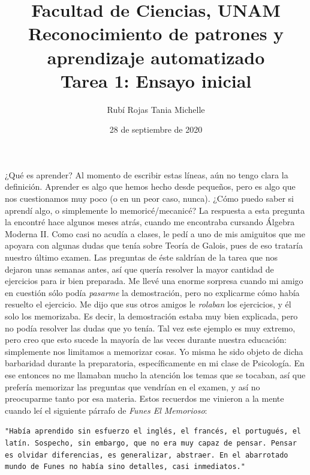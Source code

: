 \documentclass[letterpaper,11pt]{article}
\title{Facultad de Ciencias, UNAM \\ 
       Reconocimiento de patrones y aprendizaje automatizado \\ 
       Tarea 1: Ensayo inicial}
\author{Rubí Rojas Tania Michelle}
\date{28 de septiembre de 2020}
\begin{document}
\maketitle
¿Qué es aprender? Al momento de escribir estas líneas, aún no tengo clara la 
definición. Aprender es algo que hemos hecho desde pequeños, pero es algo que 
nos cuestionamos muy poco (o en un peor caso, nunca). ¿Cómo puedo saber si 
aprendí algo, o simplemente lo memoricé/mecanicé? La respuesta a esta pregunta 
la encontré hace algunos meses atrás, cuando me encontraba cursando Álgebra 
Moderna II. Como casi no acudía a clases, le pedí a uno de mis amiguitos que 
me apoyara con algunas dudas que tenía sobre Teoría de Galois, pues de eso 
trataría nuestro último examen. Las preguntas de éste saldrían de la tarea 
que nos dejaron unas semanas antes, así que quería resolver la mayor cantidad 
de ejercicios para ir bien preparada. Me llevé una enorme sorpresa cuando mi  
amigo en cuestión sólo podía \textit{pasarme} la demostración, pero no 
explicarme cómo había resuelto el ejercicio. Me dijo que sus otros amigos le 
\textit{rolaban} los ejercicios, y él solo los memorizaba. Es decir, la 
demostración estaba muy bien explicada, pero no podía resolver las dudas que 
yo tenía. Tal vez este ejemplo es muy extremo, pero creo que esto sucede la 
mayoría de las veces durante nuestra educación: simplemente nos limitamos a 
memorizar cosas. Yo misma he sido objeto de dicha barbaridad durante la 
preparatoria, específicamente en mi clase de Psicología. En ese entonces no 
me llamaban mucho la atención los temas que se tocaban, así que prefería 
memorizar las preguntas que vendrían en el examen, y así no preocuparme tanto
por esa materia. Estos recuerdos me vinieron a la mente cuando leí el siguiente
párrafo de \textit{Funes El Memorioso}:
\begin{center}
    \texttt{"Había aprendido sin esfuerzo el inglés, el francés, el portugués, 
    el latín. Sospecho, sin embargo, que no era muy capaz de pensar. Pensar 
    es olvidar diferencias, es generalizar, abstraer. En el abarrotado mundo 
    de Funes no había sino detalles, casi inmediatos."}
\end{center}
\end{document}
